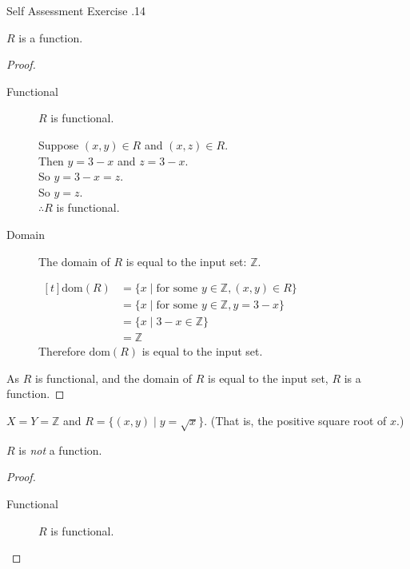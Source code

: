 \documentclass[\main/notes.tex]{subfiles}
\begin{document}
\begin{exercise}{Self Assessment Exercise \thechapter.14}
\begin{questions}
\begin{questions}
									\begin{answer}
										$R$ is a function.
										\begin{proof}
											$ $
											\begin{description}
												\item[Functional] $R$ is functional.
													\begin{subproof}[Subproof]
														Suppose $(x, y) \in R$ and $(x, z) \in R$.\\
														Then $y = 3 - x$ and $z = 3 - x$.\\
														So $y = 3 - x = z$.\\
														So $y = z$.\\
														$\therefore R$ is functional.
													\end{subproof}
												\item[Domain] The domain of $R$ is equal to the input set: $\mathbb{Z}$.
													\begin{subproof}[Subproof] $
														\begin{aligned}[t]
															\mathrm{dom}(R) &= \bigl\{x \mid \text{for some } y \in \mathbb{Z}, (x, y) \in R\bigr\}\\
															&= \{x \mid \text{for some } y \in \mathbb{Z}, y = 3 - x\}\\
															&= \{x \mid 3 - x \in \mathbb{Z}\}\\
															&= \mathbb{Z}
														\end{aligned} $\\
														Therefore $\mathrm{dom}(R)$ is equal to the input set.
													\end{subproof}
											\end{description}
											As $R$ is functional, and the domain of $R$ is equal to the input set, $R$ is a function.
										\end{proof}
									\end{answer}
								\pagebreak
								\item $X = Y = \mathbb{Z}$ and $R = \bigl\{(x, y) \mid y = \sqrt{x}\bigr\}$. (That is, the positive square root of $x$.)\\
									\begin{answer}
										$R$ is \emph{not} a function.
										\begin{proof}
											$ $
											\begin{description}
												\item[Functional] $R$ is functional.

\end{description}
\end{proof}
\end{answer}
\end{questions}
\end{questions}
\end{exercise}
\end{document}
